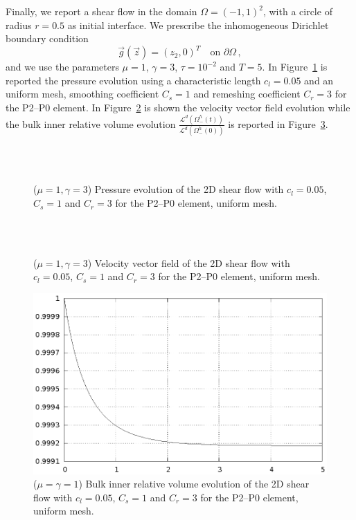 \documentclass[a4paper,12pt,onecolumn]{article}
\begin{document}
Finally, we report a shear flow in the domain $\Omega=(-1,1)^2$, with a circle
of radius $r=0.5$ as initial interface. We prescribe the inhomogeneous Dirichlet
boundary condition
\begin{equation*}
\vec g(\vec z)=(z_2,0)^T\quad \mbox{on }\partial\Omega\,,
\end{equation*}
and we use the parameters $\mu=1$, $\gamma=3$, $\tau=10^{-2}$ and $T=5$. In
Figure~\ref{fig:shear_2d} is reported the pressure evolution using a
characteristic length $c_l=0.05$ and an uniform mesh, smoothing coefficient
$C_s=1$ and remeshing coefficient $C_r=3$ for the P2--P0 element. In
Figure~\ref{fig:shear_2d_velocity} is shown the velocity vector field evolution
while the bulk inner relative volume evolution
$\frac{\mathcal{L}^d(\Omega^h_-(t))}{\mathcal{L}^d(\Omega^h_-(0))}$ is reported
in Figure~\ref{fig:shear_2d_bulk_inner_volume}.
\begin{figure}[htbp]
  \centering
  \quad
  \\
  \quad
  \\
 \caption{($\mu=1,\gamma=3$) Pressure evolution of the 2D shear flow with
$c_l=0.05$, $C_s=1$ and $C_r=3$ for the P2--P0 element, uniform mesh.}
  \label{fig:shear_2d}
\end{figure}

\begin{figure}[htbp]
  \centering
  \quad
  \\
  \quad
  \\
  \caption{($\mu=1,\gamma=3$) Velocity vector field of the 2D shear flow with
$c_l=0.05$, $C_s=1$ and $C_r=3$ for the P2--P0 element, uniform mesh.}
  \label{fig:shear_2d_velocity}
\end{figure}

\begin{figure}[htbp]
  \centering
  \includegraphics[width=.45\textwidth]{figures/2d_shear_bulk_inner_volume.ps}
  \caption{($\mu=\gamma=1$) Bulk inner relative volume evolution of the 2D
shear flow with $c_l=0.05$, $C_s=1$ and $C_r=3$ for the P2--P0 element, uniform
mesh.}
  \label{fig:shear_2d_bulk_inner_volume}
\end{figure}
\end{document}
